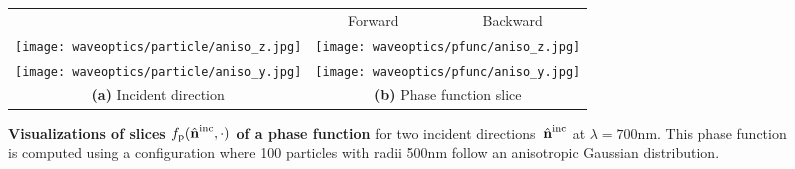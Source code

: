 \begin{figure}[h]
    \centering
    \setlength{\resLen}{1.5in}
    \addtolength{\tabcolsep}{3pt}
    \begin{tabular}{ccc}
        & Forward & Backward\\
        \texttt{[image: waveoptics/particle/aniso\_z.jpg]}
        & \multicolumn{2}{c}{\texttt{[image: waveoptics/pfunc/aniso\_z.jpg]}}
        \\
        \texttt{[image: waveoptics/particle/aniso\_y.jpg]}
        & \multicolumn{2}{c}{\texttt{[image: waveoptics/pfunc/aniso\_y.jpg]}}
        \\
        \textbf{(a)} Incident direction & \multicolumn{2}{c}{\textbf{(b)} Phase function slice}
    \end{tabular}
    \caption[Visualizations of phase function]{\label{fig:waveoptics:aniso1}
        \textbf{Visualizations of slices $f_\mathrm{p}({\hat{\mathbf{n}}}^\mathrm{inc},\cdot)$ of a phase function} for two incident directions~${\hat{\mathbf{n}}}^\mathrm{inc}$ at $\lambda = 700\text{nm}$.
        This phase function is computed using a configuration where 100 particles with radii 500nm follow an anisotropic Gaussian distribution.
    }
\end{figure}
